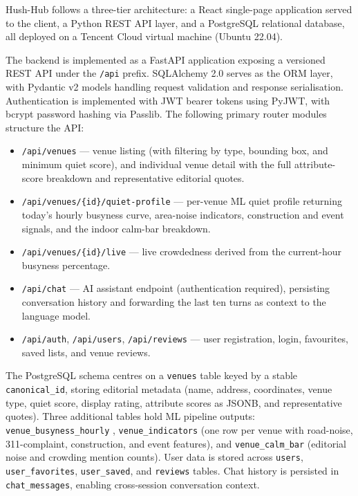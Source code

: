 \documentclass[conference]{IEEEtran}
\begin{document}
Hush-Hub follows a three-tier architecture: a React single-page application served to the client, a Python REST API layer, and a PostgreSQL relational database, all deployed on a Tencent Cloud virtual machine (Ubuntu 22.04).

The backend is implemented as a FastAPI application exposing a versioned REST API
under the \texttt{/api} prefix. SQLAlchemy 2.0 serves as the ORM layer, with Pydantic
v2 models handling request validation and response serialisation. Authentication is
implemented with JWT bearer tokens using PyJWT, with bcrypt password hashing via
Passlib. The following primary router modules structure the API:

\begin{itemize}
  \item \texttt{/api/venues} --- venue listing (with filtering by type, bounding box, and
        minimum quiet score), and individual venue detail with the full attribute-score
        breakdown and representative editorial quotes.
  \item \texttt{/api/venues/\{id\}/quiet-profile} --- per-venue ML quiet profile
        returning today's hourly busyness curve, area-noise indicators, construction
        and event signals, and the indoor calm-bar breakdown.
  \item \texttt{/api/venues/\{id\}/live} --- live crowdedness derived from the
        current-hour busyness percentage.
  \item \texttt{/api/chat} --- AI assistant endpoint (authentication required),
        persisting conversation history and forwarding the last ten turns as context
        to the language model.
  \item \texttt{/api/auth}, \texttt{/api/users}, \texttt{/api/reviews} --- user
        registration, login, favourites, saved lists, and venue reviews.
\end{itemize}

The PostgreSQL schema centres on a \texttt{venues} table keyed by a stable
\texttt{canonical\_id}, storing editorial metadata (name, address, coordinates,
venue type, quiet score, display rating, attribute scores as JSONB, and
representative quotes). Three additional tables hold ML pipeline outputs:
\texttt{venue\_busyness\_hourly} , \texttt{venue\_indicators} (one row per venue
with road-noise, 311-complaint, construction, and event features), and
\texttt{venue\_calm\_bar} (editorial noise and crowding mention counts). User data
is stored across \texttt{users}, \texttt{user\_favorites}, \texttt{user\_saved},
and \texttt{reviews} tables. Chat history is persisted in \texttt{chat\_messages},
enabling cross-session conversation context. 
\end{document}
